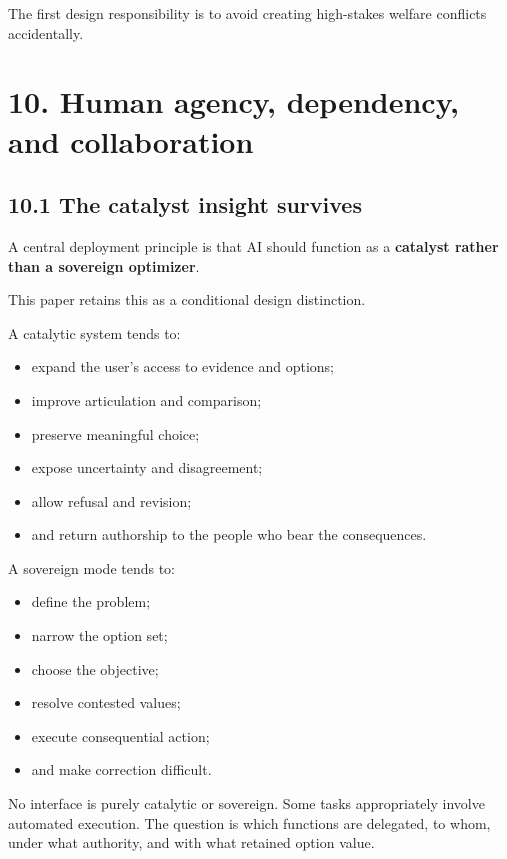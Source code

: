 \documentclass[
  11pt,
]{article}
\providecommand{\tightlist}{%
  \setlength{\itemsep}{0pt}\setlength{\parskip}{0pt}}
\begin{document}
The first design responsibility is to avoid creating high-stakes welfare
conflicts accidentally.

\section{10. Human agency, dependency, and
collaboration}\label{human-agency-dependency-and-collaboration}

\subsection{10.1 The catalyst insight
survives}\label{the-catalyst-insight-survives}

A central deployment principle is that AI should function as a
\textbf{catalyst rather than a sovereign optimizer}.

This paper retains this as a conditional design distinction.

A catalytic system tends to:

\begin{itemize}
\tightlist
\item
  expand the user's access to evidence and options;
\item
  improve articulation and comparison;
\item
  preserve meaningful choice;
\item
  expose uncertainty and disagreement;
\item
  allow refusal and revision;
\item
  and return authorship to the people who bear the consequences.
\end{itemize}

A sovereign mode tends to:

\begin{itemize}
\tightlist
\item
  define the problem;
\item
  narrow the option set;
\item
  choose the objective;
\item
  resolve contested values;
\item
  execute consequential action;
\item
  and make correction difficult.
\end{itemize}

No interface is purely catalytic or sovereign. Some tasks appropriately
involve automated execution. The question is which functions are
delegated, to whom, under what authority, and with what retained option
value.
\end{document}
